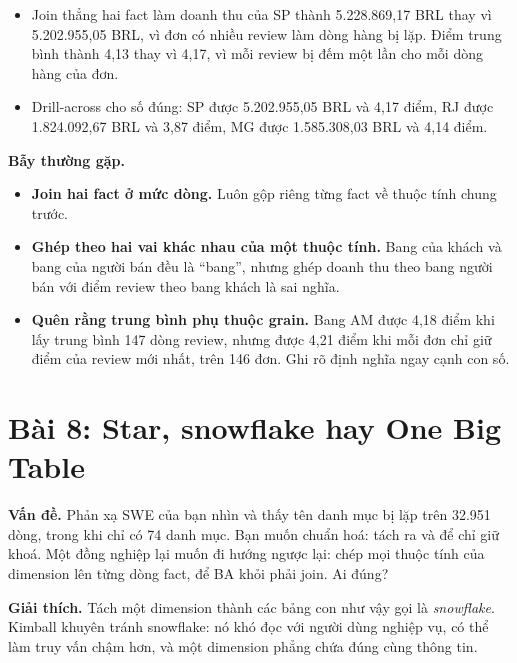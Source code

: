 \begin{itemize}
  \item Join thẳng hai fact làm doanh thu của SP thành 5.228.869,17 BRL thay vì 5.202.955,05 BRL, vì đơn có nhiều review làm dòng hàng bị lặp. Điểm trung bình thành 4,13 thay vì 4,17, vì mỗi review bị đếm một lần cho mỗi dòng hàng của đơn.
  \item Drill-across cho số đúng: SP được 5.202.955,05 BRL và 4,17 điểm, RJ được 1.824.092,67 BRL và 3,87 điểm, MG được 1.585.308,03 BRL và 4,14 điểm.
\end{itemize}

\begin{luuy}
\textbf{Bẫy thường gặp.}
\begin{itemize}
  \item \textbf{Join hai fact ở mức dòng.} Luôn gộp riêng từng fact về thuộc tính chung trước.
  \item \textbf{Ghép theo hai vai khác nhau của một thuộc tính.} Bang của khách và bang của người bán đều là ``bang'', nhưng ghép doanh thu theo bang người bán với điểm review theo bang khách là sai nghĩa.
  \item \textbf{Quên rằng trung bình phụ thuộc grain.} Bang AM được 4,18 điểm khi lấy trung bình 147 dòng review, nhưng được 4,21 điểm khi mỗi đơn chỉ giữ điểm của review mới nhất, trên 146 đơn. Ghi rõ định nghĩa ngay cạnh con số.
\end{itemize}
\end{luuy}

\section{Bài 8: Star, snowflake hay One Big Table}

\textbf{Vấn đề.} Phản xạ SWE của bạn nhìn  và thấy tên danh mục bị lặp trên 32.951 dòng, trong khi chỉ có 74 danh mục. Bạn muốn chuẩn hoá: tách ra  và để  chỉ giữ khoá. Một đồng nghiệp lại muốn đi hướng ngược lại: chép mọi thuộc tính của dimension lên từng dòng fact, để BA khỏi phải join. Ai đúng?

\textbf{Giải thích.} Tách một dimension thành các bảng con như vậy gọi là \textit{snowflake}. Kimball khuyên tránh snowflake: nó khó đọc với người dùng nghiệp vụ, có thể làm truy vấn chậm hơn, và một dimension phẳng chứa đúng cùng thông tin.

